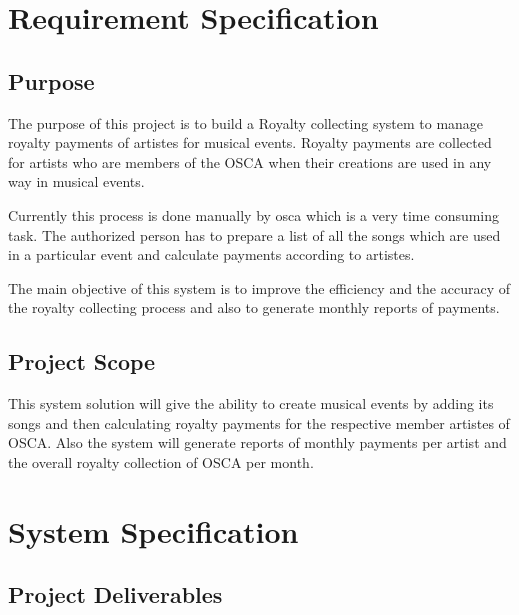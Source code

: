 \documentclass[12pt,a4paper]{article}
\begin{document}
\section{Requirement Specification}
\vspace{12pt}
\subsection{Purpose}
\vspace{12pt}

The purpose of this project is to build a Royalty collecting system to manage royalty payments of artistes for musical events.
Royalty payments are collected for artists who are members of the OSCA when their creations are used in any way in musical events.
\vspace{12pt}

Currently this process is done manually by osca which is a very time consuming task.
The authorized person has to prepare a list of all the songs which are used in a particular event and calculate payments according to artistes.
\vspace{12pt}

The main objective of this system is to improve the efficiency and the accuracy of the royalty collecting process and also to generate monthly reports of payments.
\vspace{12pt}

\subsection{Project Scope}
\vspace{12pt}

This system solution will give the ability to create musical events by adding its songs and then calculating royalty payments for the respective member artistes of OSCA.
Also the system will generate reports of monthly payments per artist and the overall royalty collection of OSCA per month.
\vspace{12pt}

\clearpage

\section{System Specification}
\vspace{12pt}

\subsection{Project Deliverables}
\vspace{12pt}
\end{document}
